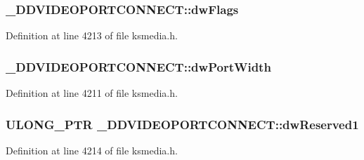 \subsubsection[{\texorpdfstring{dw\+Flags}{dwFlags}}]{ \+\_\+\+D\+D\+V\+I\+D\+E\+O\+P\+O\+R\+T\+C\+O\+N\+N\+E\+C\+T\+::dw\+Flags}\hypertarget{struct___d_d_v_i_d_e_o_p_o_r_t_c_o_n_n_e_c_t_a1d83c421a5d928155295696e8b9d846c}{}\label{struct___d_d_v_i_d_e_o_p_o_r_t_c_o_n_n_e_c_t_a1d83c421a5d928155295696e8b9d846c}


Definition at line 4213 of file ksmedia.\+h.

\subsubsection[{\texorpdfstring{dw\+Port\+Width}{dwPortWidth}}]{ \+\_\+\+D\+D\+V\+I\+D\+E\+O\+P\+O\+R\+T\+C\+O\+N\+N\+E\+C\+T\+::dw\+Port\+Width}\hypertarget{struct___d_d_v_i_d_e_o_p_o_r_t_c_o_n_n_e_c_t_ad4cb62df3693142f236bf69742b2b8d3}{}\label{struct___d_d_v_i_d_e_o_p_o_r_t_c_o_n_n_e_c_t_ad4cb62df3693142f236bf69742b2b8d3}


Definition at line 4211 of file ksmedia.\+h.

\subsubsection[{\texorpdfstring{dw\+Reserved1}{dwReserved1}}]{\setlength{\rightskip}{0pt plus 5cm}U\+L\+O\+N\+G\+\_\+\+P\+TR \+\_\+\+D\+D\+V\+I\+D\+E\+O\+P\+O\+R\+T\+C\+O\+N\+N\+E\+C\+T\+::dw\+Reserved1}\hypertarget{struct___d_d_v_i_d_e_o_p_o_r_t_c_o_n_n_e_c_t_a7ba957276be10a8994481abcecc00bcd}{}\label{struct___d_d_v_i_d_e_o_p_o_r_t_c_o_n_n_e_c_t_a7ba957276be10a8994481abcecc00bcd}


Definition at line 4214 of file ksmedia.\+h.

